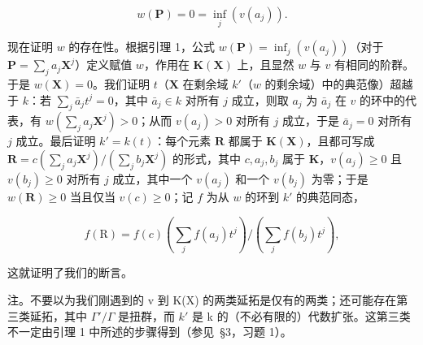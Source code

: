 \[
w (\mathbf {P}) = 0 = \inf _ {j} (v (a _ {j})).
\]

现在证明 \(w\) 的存在性。根据引理 1，公式 \(w(\mathbf{P}) = \inf_{j}(v(a_j))\)（对于 \(\mathbf{P} = \sum_{j} a_j \mathbf{X}^j\)）定义赋值 \(w\)，作用在 \(\mathbf{K}(\mathbf{X})\) 上，且显然 \(w\) 与 \(v\) 有相同的阶群。于是 \(w(\mathbf{X}) = 0\)。我们证明 \(t\)（\(\mathbf{X}\) 在剩余域 \(k'\)（\(w\) 的剩余域）中的典范像）超越于 \(k\)：若 \(\sum_{j} \bar{a}_j t^j = 0\)，其中 \(\bar{a}_j \in k\) 对所有 \(j\) 成立，则取 \(a_j\) 为 \(\bar{a}_j\) 在 \(v\) 的环中的代表，有 \(w\left(\sum_{j} a_j \mathbf{X}^j\right) > 0\)；从而 \(v(a_j) > 0\) 对所有 \(j\) 成立，于是 \(\bar{a}_j = 0\) 对所有 \(j\) 成立。最后证明 \(k' = k(t)\)：每个元素 \(\mathbf{R}\) 都属于 \(\mathbf{K}(\mathbf{X})\)，且都可写成 \(\mathbf{R} = c\left(\sum_{j} a_j \mathbf{X}^j\right) / \left(\sum_{j} b_j \mathbf{X}^j\right)\) 的形式，其中 \(c, a_j, b_j\) 属于 \(\mathbf{K}\)，\(v(a_j) \geqslant 0\) 且 \(v(b_j) \geqslant 0\) 对所有 \(j\) 成立，其中一个 \(v(a_j)\) 和一个 \(v(b_j)\) 为零；于是 \(w(\mathbf{R}) \geqslant 0\) 当且仅当 \(v(c) \geqslant 0\)；记 \(f\) 为从 \(w\) 的环到 \(k'\) 的典范同态，

\[
f (\mathrm{R}) = f (c) \left(\sum_ {j} f (a _ {j}) t ^ {j}\right) / \left(\sum_ {j} f (b _ {j}) t ^ {j}\right),
\]

这就证明了我们的断言。

注。不要以为我们刚遇到的 v 到 K(X) 的两类延拓是仅有的两类；还可能存在第三类延拓，其中 \(\Gamma'/\Gamma\) 是扭群，而 \(k'\) 是 k 的（不必有限的）代数扩张。这第三类不一定由引理 1 中所述的步骤得到（参见~§3，习题 1）。

